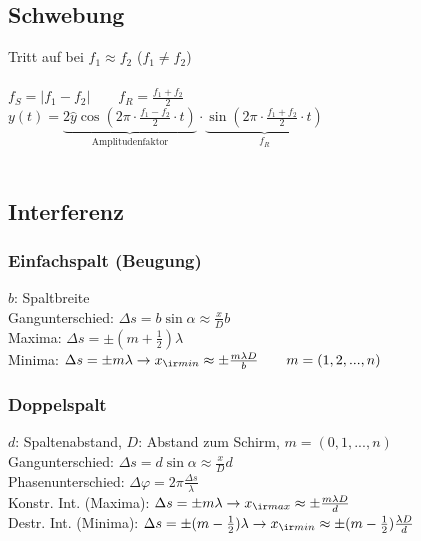 \begin{sectionbox}
    \subsection{Schwebung}
    Tritt auf bei $f_1\approx f_2$ ($f_1 \neq f_2$)\\ \\
    $f_S=|f_1-f_2| \qquad f_R= \frac{f_1+f_2}{2}$\\
    $y(t)=\underbrace{2\hat{y}\cos(2\pi \cdot \frac{f_1-f_2}{2}\cdot t)}_{\text{Amplitudenfaktor}} \cdot \underbrace{\sin(2\pi \cdot \frac{f_1+f_2}{2}\cdot t)}_{f_R} $\\ \\
\end{sectionbox}


\begin{sectionbox}
    \subsection{Interferenz}
    \subsubsection{Einfachspalt (Beugung)}
    $b$: Spaltbreite \\
    Gangunterschied: $\Delta s = b\sin\alpha \approx \frac{x}{D}b$ \\
    Maxima: $\Delta s=\pm (m + \frac{1}{2})\lambda$ \\
    Minima: $\Delta s=\pm m\lambda \rightarrow x_{\ir min} \approx \pm\frac{m\lambda D}{b} \qquad m = (1,2,...,n)$ \\

    \subsubsection{Doppelspalt}
    $d$: Spaltenabstand, $D$: Abstand zum Schirm, $m = (0,1,...,n)$ \\
    Gangunterschied: $\Delta s = d\sin\alpha \approx \frac{x}{D}d$ \\
    Phasenunterschied: $\Delta\varphi = 2\pi \frac{\Delta s}{\lambda}$ \\
    Konstr. Int. (Maxima): $\Delta s=\pm m\lambda \rightarrow x_{\ir max}\approx\pm\frac{m\lambda D}{d}$ \\
    Destr. Int. (Minima): $\Delta s = \pm (m - \frac{1}{2})\lambda \rightarrow x_{\ir min}\approx \pm (m - \frac{1}{2})\frac{\lambda D}{d}$ \\


\end{sectionbox}
